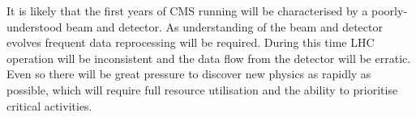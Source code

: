 


It is likely that the first years of CMS running will be characterised by a poorly-understood beam and detector. As understanding of the beam and detector evolves frequent data reprocessing will be required. During this time LHC operation will be inconsistent and the data flow from the detector will be erratic. Even so there will be great pressure to discover new physics as rapidly as possible, which will require full resource utilisation and the ability to prioritise critical activities.

